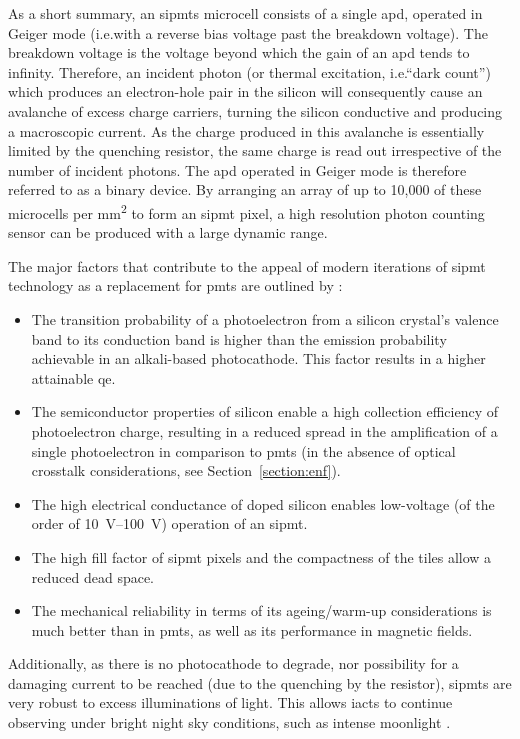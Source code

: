 As a short summary, an \glspl{sipmt} microcell consists of a single \gls{apd}, operated in Geiger mode (i.e.\@ with a reverse bias voltage past the breakdown voltage). The breakdown voltage is the voltage beyond which the gain of an \gls{apd} tends to infinity. Therefore, an incident photon (or thermal excitation, i.e.\@ ``dark count'') which produces an electron-hole pair in the silicon will consequently cause an avalanche of excess charge carriers, turning the silicon conductive and producing a macroscopic current. As the charge produced in this avalanche is essentially limited by the quenching resistor, the same charge is read out irrespective of the number of incident photons. The \gls{apd} operated in Geiger mode is therefore referred to as a binary device. By arranging an array of up to 10,000 of these microcells per \si{mm\squared} to form an \gls{sipmt} pixel, a high resolution photon counting sensor can be produced with a large dynamic range.

The major factors that contribute to the appeal of modern iterations of \gls{sipmt} technology as a replacement for \glspl{pmt} are outlined by \textcite{Ghassemi2017}:
\begin{itemize}
\item The transition probability of a photoelectron from a silicon crystal’s valence band to its conduction band is higher than the emission probability achievable in an alkali-based photocathode. This factor results in a higher attainable \gls{qe}. 
\item The semiconductor properties of silicon enable a high collection efficiency of photoelectron charge, resulting in a reduced spread in the amplification of a single photoelectron in comparison to \glspl{pmt} (in the absence of optical crosstalk considerations, see Section~\ref{section:enf}).
\item The high electrical conductance of doped silicon enables low-voltage (of the order of \SIrange{10}{100}{V}) operation of an \gls{sipmt}.
\item The high fill factor of \gls{sipmt} pixels and the compactness of the tiles allow a reduced dead space.
\item The mechanical reliability in terms of its ageing/warm-up considerations is much better than in \glspl{pmt}, as well as its performance in magnetic fields.
\end{itemize}

Additionally, as there is no photocathode to degrade, nor possibility for a damaging current to be reached (due to the quenching by the resistor), \glspl{sipmt} are very robust to excess illuminations of light. This allows \glspl{iact} to continue observing under bright night sky conditions, such as intense moonlight \cite{Knoetig2013,Heller2017}.

